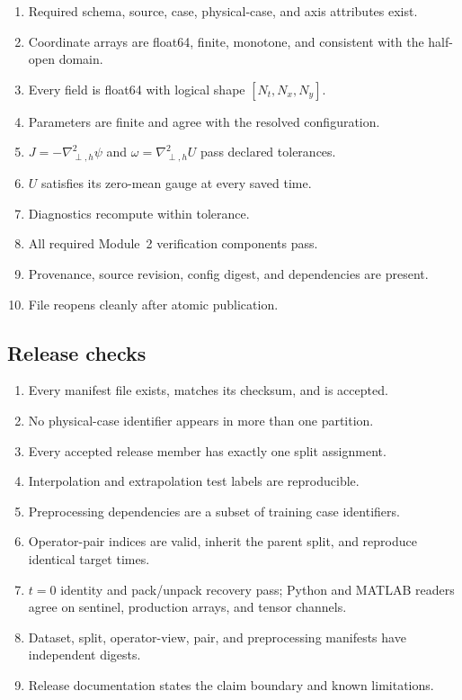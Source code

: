 \documentclass[11pt]{article}
\newcommand{\Laph}{\nabla_{\!\perp,h}^{2}}
\begin{document}
\begin{enumerate}[label=$\square$]
  \item Required schema, source, case, physical-case, and axis attributes exist.
  \item Coordinate arrays are float64, finite, monotone, and consistent with the half-open domain.
  \item Every field is float64 with logical shape $[N_t,N_x,N_y]$.
  \item Parameters are finite and agree with the resolved configuration.
  \item $J=-\Laph\psi$ and $\omega=\Laph U$ pass declared tolerances.
  \item $U$ satisfies its zero-mean gauge at every saved time.
  \item Diagnostics recompute within tolerance.
  \item All required Module~2 verification components pass.
  \item Provenance, source revision, config digest, and dependencies are present.
  \item File reopens cleanly after atomic publication.
\end{enumerate}

\subsection*{Release checks}

\begin{enumerate}[label=$\square$]
  \item Every manifest file exists, matches its checksum, and is accepted.
  \item No physical-case identifier appears in more than one partition.
  \item Every accepted release member has exactly one split assignment.
  \item Interpolation and extrapolation test labels are reproducible.
  \item Preprocessing dependencies are a subset of training case identifiers.
  \item Operator-pair indices are valid, inherit the parent split, and reproduce identical target times.
  \item $t=0$ identity and pack/unpack recovery pass; Python and MATLAB readers agree on sentinel, production arrays, and tensor channels.
  \item Dataset, split, operator-view, pair, and preprocessing manifests have independent digests.
  \item Release documentation states the claim boundary and known limitations.
\end{enumerate}
\end{document}
